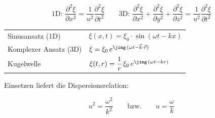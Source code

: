 \[ \boxed{ \text{1D: } \frac{\partial^2 \xi}{\partial x^2} = \frac{1}{u^2} \frac{\partial^2 \xi}{\partial t^2} } \qquad \boxed{ \text{3D: } \frac{\partial^2 \xi}{\partial x^2} + \frac{\partial^2 \xi}{\partial y^2} + \frac{\partial^2 \xi}{\partial z^2} = \frac{1}{u^2} \frac{\partial^2 \xi}{\partial t^2} } \]

\renewcommand{\arraystretch}{1.5}
\begin{tabular}{ll}
    Sinusansatz (1D)      & $\xi(x, t) = \xi_0 \cdot \sin(\omega t - k x)$ \\
    Komplexer Ansatz (3D) & $\xi = \xi_0 \, e^{\jimg \, (\omega t - \vec{k} \cdot \vec{r})}$ \\
    Kugelwelle            & $\xi(t, r) = \dfrac{1}{r} \, \xi_0 \, e^{\jimg \, (\omega t - k r)}$ \\
\end{tabular}
\renewcommand{\arraystretch}{1}

\medskip

Einsetzen liefert die Dispersionsrelation:

$$ \boxed{ u^2 = \frac{\omega^2}{k^2} \qquad \text{bzw.} \qquad u = \frac{\omega}{k} } $$

